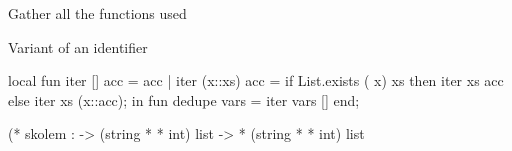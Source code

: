 \nwenddocs{}\endmoddef\nwstartdeflinemarkup{}\nwenddeflinemarkup
\LA{}Gather all the functions used~{\nwtagstyle{}}\RA{}

\LA{}Variant of an identifier~{\nwtagstyle{}}\RA{}

local
  fun iter [] acc = acc
    | iter (x::xs) acc = if List.exists ( x) xs
                         then iter xs acc
                         else iter xs (x::acc);
in
fun dedupe vars = iter vars []
end;

(* skolem :  ->  (string *  * int) list ->
      * (string *  * int) list

